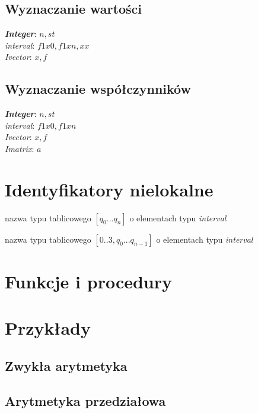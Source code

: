 \documentclass[a4paper, 10pt]{article}
\begin{document}
\subsection*{Wyznaczanie wartości}

\textbf{\textit{Integer}}: $n,st$\\
\textit{interval}: $f1x0,f1xn,xx$\\
\textit{Ivector}: $x,f$

\subsection*{Wyznaczanie współczynników}

\textbf{\textit{Integer}}: $n,st$\\
\textit{interval}: $f1x0,f1xn$\\
\textit{Ivector}: $x,f$\\
\textit{Imatrix}: $a$

\section{Identyfikatory nielokalne}

\begin{description}[before={\renewcommand\makelabel[1]{\normalfont ##1}}]
\item[\textit{Ivector} --] nazwa typu tablicowego $[q_0...q_n]$ o elementach typu \textit{interval}
\item[\textit{Imatrix} --] nazwa typu tablicowego $[0..3, q_0...q_{n-1}]$ o elementach typu \textit{interval}
\end{description}


\section{Funkcje i procedury}


\section{Przykłady}


\subsection*{Zwykła arytmetyka}


\subsection*{Arytmetyka przedziałowa}

\end{document}
